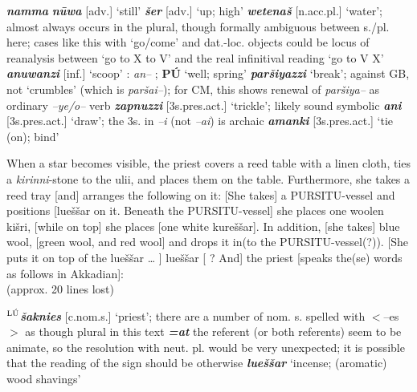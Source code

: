 \documentclass[10pt]{article}
\newcommand{\supersc}[1]{$^{\textrm{\scriptsize{#1}}}$}  	%
\newcommand{\bit}[1]{\textbf{\textit{#1}}}				%
\newcommand{\p}[1]{{\tiny[{#1}]}}					%
\newcommand{\hith}{\textsubwedge{h}}
\newcommand{\man}{\supersc{L\'U}}
\renewcommand{\.}[1]{\textsubdot{#1}}
\begin{document}
\begin{description}
\begin{notes}
\bit{namma} \bit{n\=uwa} \p{adv.} `still' \bit{\v{s}er} \p{adv.} `up; high' \bit{wetena\v{s}} \p{n.acc.pl.} `water'; almost always occurs in the plural, though formally ambiguous between s./pl. here; cases like this with `go/come' and dat.-loc. objects could be locus of reanalysis between `go to X to V' and the real infinitival reading `go to V X' \bit{{\hith}anuwanzi} \p{inf.} `scoop' : \textit{{\hith}an--} ; \textbf{P\'U} `well; spring' \bit{par\v{s}iyazzi} `break'; against GB, not `crumbles' (which is \textit{par\v{s}ai--}); for CM, this shows renewal of \textit{par\v{s}iya--} as ordinary \textit{--ye/o--} verb \bit{zapnuzzi} \p{3s.pres.act.} `trickle'; likely sound symbolic \bit{{\hith}ani} \p{3s.pres.act.} `draw'; the 3s. in \textit{--i} (not \textit{--ai}) is archaic \bit{{\hith}amanki} \p{3s.pres.act.} `tie (on); bind'

\end{notes}


\item[\S4 (33--44 :] When a star becomes visible, the priest covers a reed table with a linen cloth, ties a \textit{kirinni}-stone to the uli{\hith}i, and places them on the table. Furthermore, she takes a reed tray [and] arranges the following on it: [She takes] a PURSITU-vessel and positions [lue\v{s}\v{s}ar on it. Beneath the PURSITU-vessel] she places one woolen ki\v{s}ri, [while on top] she places [one white kure\v{s}\v{s}ar]. In addition, [she takes] blue wool, [green wool, and red wool] and drops it in(to the PURSITU-vessel(?)). [She puts it on top of the lue\v{s}\v{s}ar {\ldots} ] lue\v{s}\v{s}ar [ ? And] the priest [speaks the(se) words as follows in Akkadian]: \\

(approx. 20 lines lost)

\begin{notes}

\textbf{\man}\bit{\v{s}aknies} \p{c.nom.s.} `priest'; there are a number of nom. s. spelled with $<$--es$>$ as though plural in this text \bit{=at} the referent (or both referents) seem to be animate, so the resolution with neut. pl. would be very unexpected; it is possible that the reading of the sign should be otherwise \bit{lue\v{s}\v{s}ar} `incense; (aromatic) wood shavings'

\end{notes}


\end{description}
\end{document}
